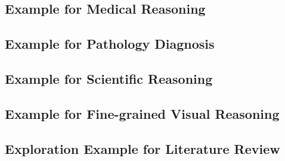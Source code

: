 \clearpage
\subsection{Example for Medical Reasoning}



\clearpage
\subsection{Example for Pathology Diagnosis}



\clearpage
\subsection{Example for Scientific Reasoning}


\clearpage
\subsection{Example for Fine-grained Visual Reasoning}


\clearpage
\subsection{Exploration Example for Literature Review}
\label{app:example_exploration}


